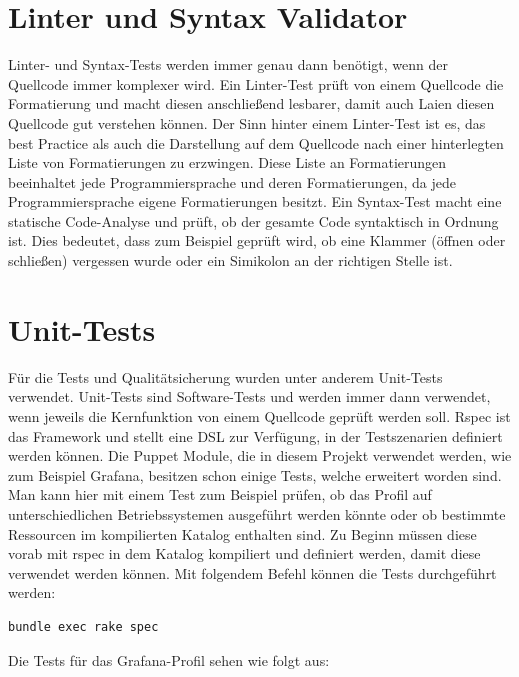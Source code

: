 \section{Linter und Syntax Validator}
Linter- und Syntax-Tests werden immer genau dann benötigt, wenn der Quellcode
immer komplexer wird. Ein Linter-Test prüft von einem Quellcode die
Formatierung und macht diesen anschließend lesbarer, damit auch Laien diesen
Quellcode gut verstehen können. Der Sinn hinter einem Linter-Test ist es, das
best Practice als auch die Darstellung auf dem Quellcode nach einer
hinterlegten Liste von Formatierungen zu erzwingen. Diese Liste an
Formatierungen beeinhaltet jede Programmiersprache und deren Formatierungen,
da jede Programmiersprache eigene Formatierungen besitzt. Ein Syntax-Test macht
eine statische Code-Analyse und prüft, ob der gesamte Code syntaktisch in
Ordnung ist. Dies bedeutet, dass zum Beispiel geprüft wird, ob eine Klammer
(öffnen oder schließen) vergessen wurde oder ein Simikolon an der richtigen
Stelle ist.
\mr%

\section{Unit-Tests}
\label{sec:unit_tests}
Für die Tests und Qualitätsicherung wurden unter anderem Unit-Tests verwendet.
Unit-Tests sind Software-Tests und werden immer dann verwendet, wenn jeweils
die Kernfunktion von einem Quellcode geprüft werden soll. Rspec ist das
Framework und stellt eine \gls{DSL} zur Verfügung, in der Testszenarien
definiert werden können. Die Puppet Module, die in diesem Projekt verwendet
werden, wie zum Beispiel Grafana, besitzen schon einige Tests, welche erweitert
worden sind. Man kann hier mit einem Test zum Beispiel prüfen, ob das Profil
auf unterschiedlichen Betriebssystemen ausgeführt werden könnte oder ob
bestimmte Ressourcen im kompilierten Katalog enthalten sind. Zu Beginn müssen
diese vorab mit rspec in dem Katalog kompiliert und definiert werden, damit
diese verwendet werden können. Mit folgendem Befehl können die Tests
durchgeführt werden:
\begin{verbatim}
bundle exec rake spec
\end{verbatim}

Die Tests für das Grafana-Profil sehen wie folgt aus:

\begin{center}
  \inputminted{ruby}{../listings/rspec-grafana.txt}
\end{center}

